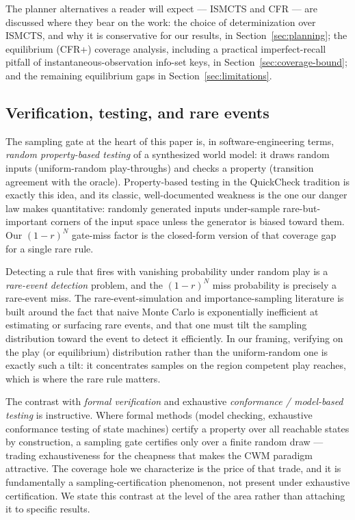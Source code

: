 \documentclass[11pt]{article}
\theoremstyle{remark}
\begin{document}
The planner alternatives a reader will expect --- ISMCTS \citep{cowling2012ismcts} and CFR \citep{zinkevich2007cfr,lanctot2009mccfr,tammelin2014cfrplus} --- are discussed where they bear on the work: the choice of determinization over ISMCTS, and why it is conservative for our results, in Section~\ref{sec:planning}; the equilibrium (CFR+) coverage analysis, including a practical imperfect-recall pitfall of instantaneous-observation info-set keys, in Section~\ref{sec:coverage-bound}; and the remaining equilibrium gaps in Section~\ref{sec:limitations}.

\subsection{Verification, testing, and rare events}

The sampling gate at the heart of this paper is, in software-engineering terms, \emph{random property-based testing} of a synthesized world model: it draws random inputs (uniform-random play-throughs) and checks a property (transition agreement with the oracle). Property-based testing in the QuickCheck tradition \citep{claessen2000quickcheck} is exactly this idea, and its classic, well-documented weakness is the one our danger law makes quantitative: randomly generated inputs under-sample rare-but-important corners of the input space unless the generator is biased toward them. Our $(1-r)^N$ gate-miss factor is the closed-form version of that coverage gap for a single rare rule.

Detecting a rule that fires with vanishing probability under random play is a \emph{rare-event detection} problem, and the $(1-r)^N$ miss probability is precisely a rare-event miss. The rare-event-simulation and importance-sampling literature \citep[e.g.,][]{rubinstein2017montecarlo} is built around the fact that naive Monte Carlo is exponentially inefficient at estimating or surfacing rare events, and that one must tilt the sampling distribution toward the event to detect it efficiently. In our framing, verifying on the play (or equilibrium) distribution rather than the uniform-random one is exactly such a tilt: it concentrates samples on the region competent play reaches, which is where the rare rule matters.

The contrast with \emph{formal verification} and exhaustive \emph{conformance / model-based testing} is instructive. Where formal methods (model checking, exhaustive conformance testing of state machines) certify a property over all reachable states by construction, a sampling gate certifies only over a finite random draw --- trading exhaustiveness for the cheapness that makes the CWM paradigm attractive. The coverage hole we characterize is the price of that trade, and it is fundamentally a sampling-certification phenomenon, not present under exhaustive certification. We state this contrast at the level of the area rather than attaching it to specific results.
\end{document}
